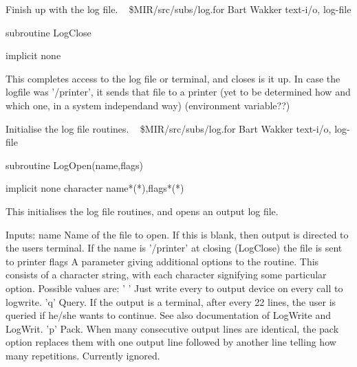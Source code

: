 %
\noindent Finish up with the log file.
\newline \ 
\newline {} \$MIR/src/subs/log.for
\newline {} Bart Wakker
\newline {} text-i/o, log-file
\par{\tenpoint
{\eightpoint\begintt
        subroutine LogClose

        implicit none

  This completes access to the log file or terminal, and closes is it up.
  In case the logfile was '/printer', it sends that file to a printer
  (yet to be determined how and which one, in a system independand way)
  (environment variable??)
\endtt}
\par}
%
\noindent Initialise the log file routines.
\newline \ 
\newline {} \$MIR/src/subs/log.for
\newline {} Bart Wakker
\newline \abox{Keywords:} text-i/o, log-file
\par{\tenpoint
{\eightpoint\begintt
        subroutine LogOpen(name,flags)

        implicit none
        character name*(*),flags*(*)

  This initialises the log file routines, and opens an output log file.

  Inputs:
    name       Name of the file to open. If this is blank, then output
               is directed to the users terminal. If the name is '/printer'
               at closing (LogClose) the file is sent to printer
    flags      A parameter giving additional options to the routine. This
               consists of a character string, with each character signifying
               some particular option. Possible values are:
                ' '    Just write every to output device on every call
                       to logwrite.
                'q'    Query. If the output is a terminal, after every
                       22 lines, the user is queried if he/she wants to
                       continue. See also documentation of LogWrite and
                       LogWrit.                        
                'p'    Pack. When many consecutive output lines are identical,
                       the pack option replaces them with one output line
                       followed by another line telling how many repetitions.
                       Currently ignored.
\endtt}
\par}
